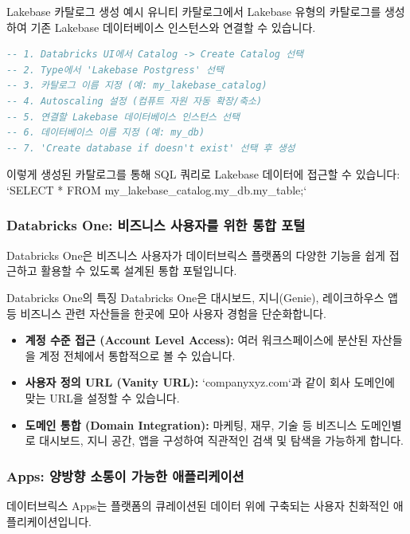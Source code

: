 \documentclass[11pt,a4paper]{article}
\begin{document}
\begin{examplebox}{Lakebase 카탈로그 생성 예시}
유니티 카탈로그에서 Lakebase 유형의 카탈로그를 생성하여 기존 Lakebase 데이터베이스 인스턴스와 연결할 수 있습니다.
\begin{lstlisting}[language=SQL, caption=Lakebase 카탈로그 생성 과정]
-- 1. Databricks UI에서 Catalog -> Create Catalog 선택
-- 2. Type에서 'Lakebase Postgress' 선택
-- 3. 카탈로그 이름 지정 (예: my_lakebase_catalog)
-- 4. Autoscaling 설정 (컴퓨트 자원 자동 확장/축소)
-- 5. 연결할 Lakebase 데이터베이스 인스턴스 선택
-- 6. 데이터베이스 이름 지정 (예: my_db)
-- 7. 'Create database if doesn't exist' 선택 후 생성
\end{lstlisting}
이렇게 생성된 카탈로그를 통해 SQL 쿼리로 Lakebase 데이터에 접근할 수 있습니다: `SELECT * FROM my_lakebase_catalog.my_db.my_table;`
\end{examplebox}

\subsubsection{Databricks One: 비즈니스 사용자를 위한 통합 포털}
Databricks One은 비즈니스 사용자가 데이터브릭스 플랫폼의 다양한 기능을 쉽게 접근하고 활용할 수 있도록 설계된 통합 포털입니다.

\begin{summarybox}{Databricks One의 특징}
Databricks One은 대시보드, 지니(Genie), 레이크하우스 앱 등 비즈니스 관련 자산들을 한곳에 모아 사용자 경험을 단순화합니다.
\end{summarybox}

\begin{itemize}
    \item \textbf{계정 수준 접근 (Account Level Access):} 여러 워크스페이스에 분산된 자산들을 계정 전체에서 통합적으로 볼 수 있습니다.
    \item \textbf{사용자 정의 URL (Vanity URL):} `companyxyz.com`과 같이 회사 도메인에 맞는 URL을 설정할 수 있습니다.
    \item \textbf{도메인 통합 (Domain Integration):} 마케팅, 재무, 기술 등 비즈니스 도메인별로 대시보드, 지니 공간, 앱을 구성하여 직관적인 검색 및 탐색을 가능하게 합니다.
\end{itemize}

\subsubsection{Apps: 양방향 소통이 가능한 애플리케이션}
데이터브릭스 Apps는 플랫폼의 큐레이션된 데이터 위에 구축되는 사용자 친화적인 애플리케이션입니다.
\end{document}
